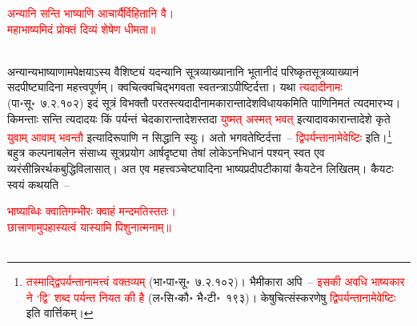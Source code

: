 \centering\textcolor{red}{अन्यानि सन्ति भाष्याणि आचार्यैर्विहितानि वै।\nopagebreak\\
महाभाष्यमिदं प्रोक्तं दिव्यं शेषेण धीमता॥}\nopagebreak\\
\\
\begin{sloppypar}\justifying\noindent अन्यान्य\-भाष्याणामपेक्षयाऽस्य वैशिष्ट्यं यदन्यानि सूत्र\-व्याख्यानानि भूतानीदं परिष्कृत\-सूत्र\-व्याख्यानं सदपीष्ट्यादिना महत्त्व\-पूर्णम्। क्वचित्क्वचिद्भगवता स्वतन्त्राऽपीष्टिर्दत्ता। यथा \textcolor{red}{त्यदादीनामः} (पा॰सू॰~७.२.१०२) इदं सूत्रं विभक्तौ परतस्त्यदादीनामकारान्तादेश\-विधायकमिति पाणिनि\-मतं त्यदमारभ्य। किमन्ताः सन्ति त्यदादयः किं पर्यन्तं चेदकारान्तादेशस्तदा \textcolor{red}{युष्मत् अस्मत् भवत्} इत्यादावकारान्तादेशे कृते \textcolor{red}{युवाम् आवाम् भवन्तौ} इत्यादिरूपाणि न सिद्धानि स्युः। अतो भगवतेष्टिर्दत्ता~– \textcolor{red}{द्विपर्यन्तानामेवेष्टिः} इति।\footnote{\textcolor{red}{तस्माद्द्वि\-पर्यन्तानामत्त्वं वक्तव्यम्} (भा॰पा॰सू॰~७.२.१०२)। भैमीकारा अपि~– \textcolor{red}{इसकी अवधि भाष्यकार ने ‘द्वि’ शब्द पर्यन्त नियत की है} (ल॰सि॰कौ॰ भै॰टी॰~१९३)। केषुचित्संस्करणेषु \textcolor{red}{द्विपर्यन्तानामेवेष्टिः} इति वार्त्तिकम्।} बहुत्र कल्पना\-बलेन संसाध्य सूत्र\-प्रयोग आर्ष\-दृष्ट्या तेषां लोकेऽनभिधानं पश्यन् स्वत एव व्यरंसीन्निरर्थक\-बुद्धि\-विलासात्। अत एव महत्त्वञ्चेष्ट्यादिना भाष्य\-प्रदीप\-टीकायां कैयटेन लिखितम्। कैयटः स्वयं कथयति~–\end{sloppypar}
\centering\textcolor{red}{भाष्याब्धिः क्वातिगम्भीरः क्वाहं मन्दमतिस्ततः।\nopagebreak\\
छात्त्राणामुपहास्यत्वं यास्यामि पिशुनात्मनाम्॥}\nopagebreak\\
\\
